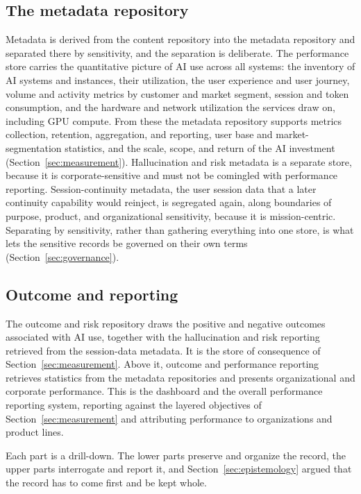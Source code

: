 \documentclass[11pt]{article}
\begin{document}
\subsection{The metadata repository}

Metadata is derived from the content repository into the metadata repository and
separated there by sensitivity, and the separation is deliberate. The performance
store carries the quantitative picture of AI use across all systems: the inventory
of AI systems and instances, their utilization, the user experience and user
journey, volume and activity metrics by customer and market segment, session and
token consumption, and the hardware and network utilization the services draw on,
including GPU compute. From these the metadata repository supports metrics
collection, retention, aggregation, and reporting, user base and
market-segmentation statistics, and the scale, scope, and return of the AI
investment (Section~\ref{sec:measurement}). Hallucination and risk
metadata is a separate store, because it is corporate-sensitive and must not
be comingled with performance reporting. Session-continuity metadata, the user
session data that a later continuity capability would reinject, is segregated
again, along boundaries of purpose, product, and organizational sensitivity,
because it is mission-centric. Separating by sensitivity, rather than gathering
everything into one store, is what lets the sensitive records be governed on their
own terms (Section~\ref{sec:governance}).

\subsection{Outcome and reporting}

The outcome and risk repository draws the positive and negative outcomes
associated with AI use, together with the hallucination and risk reporting
retrieved from the session-data metadata. It is the store of consequence of
Section~\ref{sec:measurement}. Above it, outcome and performance reporting
retrieves statistics from the metadata repositories and presents organizational
and corporate performance. This is the dashboard and the overall performance
reporting system, reporting against the layered objectives of
Section~\ref{sec:measurement} and attributing performance to organizations and
product lines.

Each part is a drill-down. The lower parts preserve and organize the record, the
upper parts interrogate and report it, and Section~\ref{sec:epistemology} argued
that the record has to come first and be kept whole.
\end{document}
